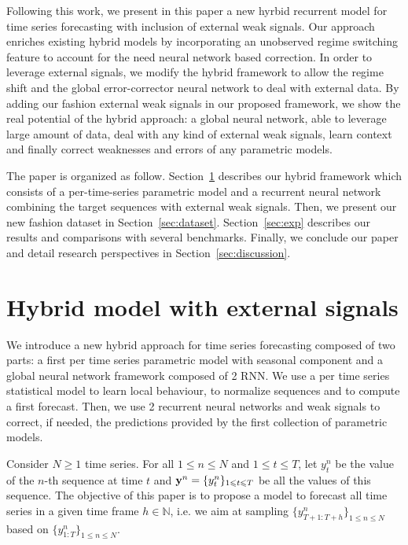 \documentclass{article} %
\newcommand{\ts}{y}
\newcommand{\fullts}{{\bf \ts}}
\newcommand{\lag}{h}
\begin{document}
Following this work, we present in this paper a new hyrbid recurrent model for time series forecasting with inclusion of external weak signals. %
Our approach enriches existing hybrid models by incorporating an unobserved regime switching feature to account for the need neural network based correction. In order to leverage external signals, we modify the hybrid framework to allow the regime shift and the  global error-corrector neural network to deal with external data. By adding our fashion external weak signals in our proposed framework, we show the real potential of the hybrid approach: a global neural network, able to leverage large amount of data, deal with any kind of external weak signals, learn context and finally correct weaknesses and errors of any parametric models.

The paper is organized as follow. Section~\ref{sec:hybrid} describes our hybrid framework which consists of a per-time-series parametric model and a recurrent neural network combining the target sequences with external weak signals. Then, we present our new fashion dataset in Section~\ref{sec:dataset}. Section~\ref{sec:exp} describes our results and comparisons with several benchmarks. Finally, we conclude our paper and detail research perspectives in Section~\ref{sec:discussion}.


\section{Hybrid model with external signals}
\label{sec:hybrid}
We introduce a new hybrid approach for time series forecasting  composed of two parts: a first per time series parametric model with seasonal component and a global neural network framework composed of 2 RNN. We use a per time series statistical model to learn local behaviour, to normalize sequences and to compute a first forecast. Then, we use 2 recurrent neural networks and weak signals to correct, if needed, the predictions provided by the first collection of parametric models.

Consider $N\geqslant 1$ time series. For all $1\leqslant n \leqslant N$ and $1\leqslant t \leqslant T$, let $\ts_t^n$ be the value of the $n$-th sequence at time $t$ and  $\fullts^n = \{\ts_t^n\}_{1\leqslant t \leqslant T}$ be all the values of this sequence.   The objective of this paper is to propose a model to  forecast all time series in a given time frame  $\lag \in \mathbb{N}$, i.e. we aim at sampling $\{\ts^n_{T+1:T+\lag}\}_{1\leqslant n \leqslant N}$ based on $\{\ts^n_{1:T}\}_{1\leqslant n \leqslant N}$.
\end{document}
